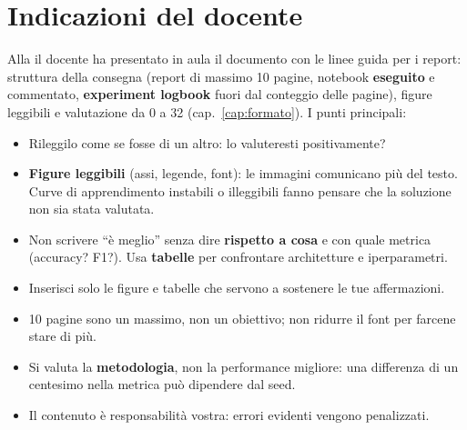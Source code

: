 \section{Indicazioni del docente}
Alla  il docente ha presentato in aula il documento con le linee guida per i
report: struttura della consegna (report di massimo 10 pagine, notebook \textbf{eseguito} e
commentato, \textbf{experiment logbook} fuori dal conteggio delle pagine), figure leggibili e
valutazione da 0 a 32 (cap.~\ref{cap:formato}). I punti principali:
\begin{esame}
\begin{itemize}
  \item Rileggilo come se fosse di un altro: lo valuteresti positivamente?
  \item \textbf{Figure leggibili} (assi, legende, font): le immagini comunicano più del testo.
        Curve di apprendimento instabili o illeggibili fanno pensare che la soluzione non sia stata valutata.
  \item Non scrivere ``è meglio'' senza dire \textbf{rispetto a cosa} e con quale metrica
        (accuracy? F1?). Usa \textbf{tabelle} per confrontare architetture e iperparametri.
  \item Inserisci solo le figure e tabelle che servono a sostenere le tue affermazioni.
  \item 10 pagine sono un massimo, non un obiettivo; non ridurre il font per farcene stare di più.
  \item Si valuta la \textbf{metodologia}, non la performance migliore: una differenza di un centesimo
        nella metrica può dipendere dal seed.
  \item Il contenuto è responsabilità vostra: errori evidenti vengono penalizzati.
\end{itemize}
\end{esame}


